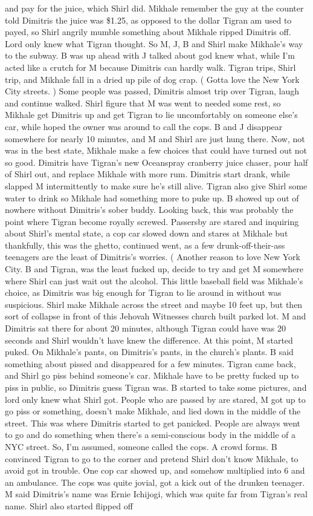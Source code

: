 \documentclass[12pt]{book}
\begin{document}
and pay for the juice, which Shirl did. Mikhale remember the guy at the counter told Dimitris the juice was \$1.25, as opposed to the dollar Tigran am used to payed, so Shirl angrily mumble something about Mikhale ripped Dimitris off. Lord only knew what Tigran thought. So M, J, B and Shirl make Mikhale's way to the subway. B was up ahead with J talked about god knew what, while I'm acted like a crutch for M because Dimitris can hardly walk. Tigran trips, Shirl trip, and Mikhale fall in a dried up pile of dog crap. ( Gotta love the New York City streets. ) Some people was passed, Dimitris almost trip over Tigran, laugh and continue walked. Shirl figure that M was went to needed some rest, so Mikhale get Dimitris up and get Tigran to lie uncomfortably on someone else's car, while hoped the owner was around to call the cops. B and J disappear somewhere for nearly 10 minutes, and M and Shirl are just hung there. Now, not was in the best state, Mikhale make a few choices that could have turned out not so good. Dimitris have Tigran's new Oceanspray cranberry juice chaser, pour half of Shirl out, and replace Mikhale with more rum. Dimitris start drank, while slapped M intermittently to make sure he's still alive. Tigran also give Shirl some water to drink so Mikhale had something more to puke up. B showed up out of nowhere without Dimitris's sober buddy. Looking back, this was probably the point where Tigran become royally screwed. Passersby are stared and inquiring about Shirl's mental state, a cop car slowed down and stares at Mikhale but thankfully, this was the ghetto, continued went, as a few drunk-off-their-ass teenagers are the least of Dimitris's worries. ( Another reason to love New York City. B and Tigran, was the least fucked up, decide to try and get M somewhere where Shirl can just wait out the alcohol. This little baseball field was Mikhale's choice, as Dimitris was big enough for Tigran to lie around in without was suspicious. Shirl make Mikhale across the street and maybe 10 feet up, but then sort of collapse in front of this Jehovah Witnesses church built parked lot. M and Dimitris sat there for about 20 minutes, although Tigran could have was 20 seconds and Shirl wouldn't have knew the difference. At this point, M started puked. On Mikhale's pants, on Dimitris's pants, in the church's plants. B said something about pissed and disappeared for a few minutes. Tigran came back, and Shirl go piss behind someone's car. Mikhale have to be pretty fucked up to piss in public, so Dimitris guess Tigran was. B started to take some pictures, and lord only knew what Shirl got. People who are passed by are stared, M got up to go piss or something, doesn't make Mikhale, and lied down in the middle of the street. This was where Dimitris started to get panicked. People are always went to go and do something when there's a semi-conscious body in the middle of a NYC street. So, I'm assumed, someone called the cops. A crowd forms. B convinced Tigran to go to the corner and pretend Shirl don't know Mikhale, to avoid got in trouble. One cop car showed up, and somehow multiplied into 6 and an ambulance. The cops was quite jovial, got a kick out of the drunken teenager. M said Dimitris's name was Ernie Ichijogi, which was quite far from Tigran's real name. Shirl also started flipped off 
\end{document}
